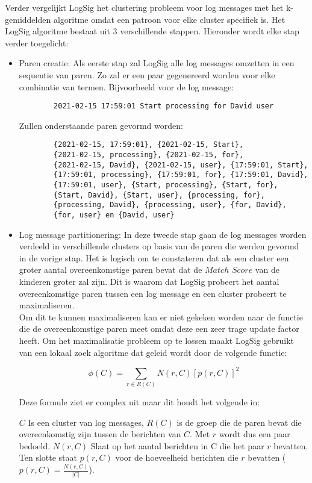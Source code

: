 Verder vergelijkt LogSig het clustering probleem voor log messages met het k-gemiddelden algoritme omdat een patroon voor elke cluster specifiek is. Het LogSig algoritme bestaat uit 3 verschillende stappen. Hieronder wordt elke stap verder toegelicht:
\begin{itemize}
    \item Paren creatie: Als eerste stap zal LogSig alle log messages omzetten in een sequentie van paren. Zo zal er een paar gegenereerd worden voor elke combinatie van termen. Bijvoorbeeld voor de log message:
    \begin{verbatim}
        2021-02-15 17:59:01 Start processing for David user
    \end{verbatim}
    Zullen onderstaande paren gevormd worden:
    \begin{verbatim}
        {2021-02-15, 17:59:01}, {2021-02-15, Start}, 
        {2021-02-15, processing}, {2021-02-15, for}, 
        {2021-02-15, David}, {2021-02-15, user}, {17:59:01, Start}, 
        {17:59:01, processing}, {17:59:01, for}, {17:59:01, David}, 
        {17:59:01, user}, {Start, processing}, {Start, for},
        {Start, David}, {Start, user}, {processing, for},
        {processing, David}, {processing, user}, {for, David},
        {for, user} en {David, user}
    \end{verbatim}
    
    \item Log message partitionering: In deze tweede stap gaan de log messages worden verdeeld in verschillende clusters op basis van de paren die werden gevormd in de vorige stap. Het is logisch om te constateren dat als een cluster een groter aantal overeenkomstige paren bevat dat de $Match$ $Score$ van de kinderen groter zal zijn. Dit is waarom dat LogSig probeert het aantal overeenkomstige paren tussen een log message en een cluster probeert te maximaliseren.\\
    Om dit te kunnen maximaliseren kan er niet gekeken worden naar de functie die de overeenkomstige paren meet omdat deze een zeer trage update factor heeft. Om het maximalisatie probleem op te lossen maakt LogSig gebruikt van een lokaal zoek algoritme dat geleid wordt door de volgende functie:
    
    \[\phi(C) = \sum_{r \in R(C)} N(r, C)[p(r, C)]^2\]
    
    Deze formule ziet er complex uit maar dit houdt het volgende in:
    
    \subitem $C$ Is een cluster van log messages, $R(C)$ is de groep die de paren bevat die overeenkomstig zijn tussen de berichten van $C$. Met $r$ wordt dus een paar bedoeld. $N(r,C)$ Slaat op het aantal berichten in C die het paar $r$ bevatten. Ten slotte staat $p(r,C)$ voor de hoeveelheid berichten die $r$ bevatten (\(p(r,C) = \frac{N(r,C)}{\lvert C \rvert}\)).
    

\end{itemize}
